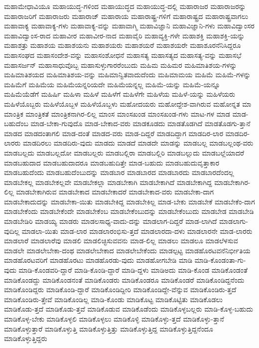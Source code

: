 {ಮಹಾಮೇಧಾವಿಯೂ
ಮಹಾಯುದ್ಧ-ಗಳಿಂದ
ಮಹಾಯುದ್ಧದ
ಮಹಾಯುದ್ಧ-ದಲ್ಲಿ
ಮಹಾರಾಜರ
ಮಹಾರಾಜರನ್ನು
ಮಹಾರಾಜರಿಗೆ
ಮಹಾರಾಜರು
ಮಹಾರಾಜ್
ಮಹಾರಾಯ
ಮಹಾರಾಷ್ಟ್ರ-ಗಳಿಗೆ
ಮಹಾರಾಷ್ಟ್ರದ
ಮಹಾರಾಷ್ಟ್ರವಾಗಲು
ಮಹಾವಾಕ್ಯ
ಮಹಾವಾಕ್ಯ-ಗಳು
ಮಹಾವಾಕ್ಯ-ವನ್ನು
ಮಹಾವಾಗ್ಮಿ
ಮಹಾವಿಜ್ಞಾನಿ
ಮಹಾವಿಜ್ಞಾನಿ-ಗಳು
ಮಹಾವಿದ್ವಾಂಸರ
ಮಹಾವಿದ್ವಾಂಸ-ರಾದ
ಮಹಾವೀರ
ಮಹಾವೀರ-ನಾದ
ಮಹಾವೈರಿ
ಮಹಾವ್ಯಕ್ತಿ-ಗಳೇ
ಮಹಾಶಕ್ತಿ
ಮಹಾಶಕ್ತಿ-ಯನ್ನು
ಮಹಾಶತ್ರು
ಮಹಾಶಯ
ಮಹಾಶಯನು
ಮಹಾಶಯರು
ಮಹಾಶಯರೆ
ಮಹಾಶಯರೇ
ಮಹಾಶೂರನೆನಿಸಿದ್ದರೂ
ಮಹಾಸಂಘದ
ಮಹಾಸಂದೇಶ-ವನ್ನು
ಮಹಾಸಂಶೋಧನೆ
ಮಹಾಸತ್ಯ
ಮಹಾಸತ್ಯದ
ಮಹಾಸತ್ಯ-ವನ್ನು
ಮಹಾಸಭೆ
ಮಹಾಸರ್ಜನ್
ಮಹಾಸಾಧುವೊಬ್ಬ
ಮಹಾಸುಳ್ಳುಗಾರರೆಂಬುದು
ಮಹಿಮ
ಮಹಿಮರ
ಮಹಿಮಾತಿಶಯ-ಗಳನ್ನು
ಮಹಿಮಾತಿಶಯದ
ಮಹಿಮಾತಿಶಯ-ವನ್ನು
ಮಹಿಮಾನ್ವಿತವಾದುದೆಂದು
ಮಹಿಮಾಮಯ
ಮಹಿಮೆ
ಮಹಿಮೆ-ಗಳನ್ನು
ಮಹಿಮೆಗೆ
ಮಹಿಮೆಯ
ಮಹಿಮೆಯನ್ನರಿಯದೇ
ಮಹಿಮೆಯನ್ನಲ್ಲ
ಮಹಿಮೆ-ಯನ್ನು
ಮಹಿಮೆ-ಯನ್ನೂ
ಮಹಿಮೆಯೆಡೆಗೆ
ಮಹಿರ್ಷಿ
ಮಹಿಳಾ
ಮಹಿಳೆ
ಮಹಿಳೆಗೆ
ಮಹಿಳೆಗೇ
ಮಹಿಳೆಯ
ಮಹಿಳೆ-ಯನ್ನು
ಮಹಿಳೆಯರು
ಮಹಿಳೆಯೊಬ್ಬರು
ಮಹಿಳೆಯೊಬ್ಬಳ
ಮಹಿಳೆಯೊಬ್ಬಳು
ಮಹೋದಯರು
ಮಹೋದ್ದೇಶ-ವಾಗಿರುವ
ಮಹೋನ್ನತ
ಮಾ
ಮಾಂತ್ರಿಕ
ಮಾಂತ್ರಿಕತೆ
ಮಾಂತ್ರಿಕನಾಗಿರ-ಲಿಲ್ಲ
ಮಾಂಸ
ಮಾಂಸಖಂಡ
ಮಾಂಸಖಂಡ-ಗಳು
ಮಾಟ-ಗಳ
ಮಾಡ
ಮಾಡ-ಬಹುದೆಂಬ
ಮಾಡ-ಬೇಕಾ-ಗುವುದೊ
ಮಾಡ-ಬೇಕಾದ-ವರು
ಮಾಡಕೂಡದು
ಮಾಡತೊಡಗಿದೆ
ಮಾಡತೊಡಗು-ತ್ತಾನೆ
ಮಾಡದ
ಮಾಡದಂತಾಗಲಿ
ಮಾಡ-ದಂತೆ
ಮಾಡದ-ವರು
ಮಾಡ-ದಿದ್ದರೆ
ಮಾಡದಿದ್ದಾಗ
ಮಾಡದಿರ-ಲಾರ
ಮಾಡದಿರ-ಲಾರರು
ಮಾಡದಿರಲು
ಮಾಡದಿರು-ವುದು
ಮಾಡದು
ಮಾಡದೆ
ಮಾಡದೇ
ಮಾಡನ್ನು
ಮಾಡಬಲ್ಲ
ಮಾಡಬಲ್ಲಂಥ-ವರು
ಮಾಡಬಲ್ಲದು
ಮಾಡಬಲ್ಲದೋ
ಮಾಡಬಲ್ಲರು
ಮಾಡಬಲ್ಲಿರಾ
ಮಾಡಬಲ್ಲಿರಿ
ಮಾಡಬಲ್ಲುದು
ಮಾಡಬಲ್ಲೆಯಾದರೆ
ಮಾಡಬಹುದಾದ
ಮಾಡಬಹುದಾದರೂ
ಮಾಡಬಹುದಿತ್ತೇ
ಮಾಡ-ಬಹುದು
ಮಾಡಬಹುದುವೃತ್ತಾಕಾರ
ಮಾಡಬಹುದೆಂದು
ಮಾಡಬಹುದೆಂಬುದನ್ನು
ಮಾಡಬಾರ
ಮಾಡಬಾರದ
ಮಾಡಬಾರದು
ಮಾಡಬಾರದೆಂದಲ್ಲ
ಮಾಡಬೇಕಲ್ಲ
ಮಾಡಬೇಕಲ್ಲವೇ
ಮಾಡಬೇಕಲ್ಲಾ
ಮಾಡಬೇಕಾಗಿ
ಮಾಡಬೇಕಾಗಿದೆ
ಮಾಡಬೇಕಾಗಿದ್ದ
ಮಾಡಬೇಕಾಗಿರ-ಲಿಲ್ಲ
ಮಾಡಬೇಕಾಗಿರುವ
ಮಾಡಬೇಕಾದ
ಮಾಡಬೇಕಾದರೆ
ಮಾಡಬೇಕಾದ-ವರು
ಮಾಡಬೇಕಾ-ದಾಗ
ಮಾಡಬೇಕಾದುದನ್ನು
ಮಾಡಬೇಕಾ-ಯಿತು
ಮಾಡಬೇಕಿದ್ದ
ಮಾಡಬೇಕಿಲ್ಲ
ಮಾಡ-ಬೇಕು
ಮಾಡಬೇಕೆ
ಮಾಡಬೇಕೆಂ-ದಾಗ
ಮಾಡಬೇಕೆಂದು
ಮಾಡಬೇಕೆಂದೇ
ಮಾಡಬೇಕೆಂಬ
ಮಾಡಬೇಕೆಂಬುದನ್ನು
ಮಾಡಬೇಕೆಂಬುದು
ಮಾಡಬೇಡ
ಮಾಡಬೇಡಿ
ಮಾಡಬೇಡಿರಿ
ಮಾಡಯ್ಯ
ಮಾಡರು
ಮಾಡಲಸಾಧ್ಯ-ವಾದು-ದನ್ನು
ಮಾಡಲಾಗ-ದಿದ್ದರೆ
ಮಾಡ-ಲಾಗಿದೆ
ಮಾಡಲಾಗು-ವುದಿಲ್ಲ
ಮಾಡಲಾ-ಯಿತು
ಮಾಡ-ಲಾರ
ಮಾಡಲಾರಂಭಿಸು-ತ್ತದೆ
ಮಾಡಲಾರದಾ-ದಳು
ಮಾಡಲಾರನೇ
ಮಾಡ-ಲಾರರು
ಮಾಡಲಾರೆ
ಮಾಡಲಾರೆವು
ಮಾಡಲಿ
ಮಾಡಲಿಚ್ಛಿಸುವವನು
ಮಾಡ-ಲಿಲ್ಲ
ಮಾಡಲು
ಮಾಡಲೂ
ಮಾಡಲೆಳಸುವ
ಮಾಡಲೇ
ಮಾಡಲೇಬೇಕಾ-ದಂಥ
ಮಾಡಲೇಬೇಕಾದ
ಮಾಡಲೇಬೇಕೆಂದು
ಮಾಡಲ್ಪಟ್ಟ
ಮಾಡಹೊರಟವನೆನಿರ್ಭೀತಿಯ
ಮಾಡಹೊರಟವರಿಗೆ
ಮಾಡಹೊರಟು
ಮಾಡಹೊರಡು-ವುದು
ಮಾಡಹೋಗಬೇಡಿ
ಮಾಡಿ
ಮಾಡಿ-ಕೊಂಡಂತಾ-ಗು-ವುದು
ಮಾಡಿ-ಕೊಂಡವರಿ-ದ್ದಾರೆ
ಮಾಡಿ-ಕೊಂಡಿ-ದ್ದಾರೆ
ಮಾಡಿ-ದ್ದಳು
ಮಾಡಿಅದು
ಮಾಡಿ-ಕೊಂಡ
ಮಾಡಿಕೊಂಡಂತೆ
ಮಾಡಿಕೊಂಡದ್ದು
ಮಾಡಿಕೊಂಡನಂತೆ
ಮಾಡಿಕೊಂಡರು
ಮಾಡಿಕೊಂಡರೂ
ಮಾಡಿಕೊಂಡರೆ
ಮಾಡಿಕೊಂಡಿದ್ದನೆಂದು
ಮಾಡಿಕೊಂಡಿದ್ದರು
ಮಾಡಿಕೊಂಡಿ-ದ್ದಾರೆ
ಮಾಡಿಕೊಂಡಿದ್ದೀರಿ
ಮಾಡಿಕೊಂಡಿದ್ದೇ-ವೆನ್ನುವ
ಮಾಡಿಕೊಂಡಿರು-ತ್ತದೆ
ಮಾಡಿಕೊಂಡಿರು-ತ್ತೇವೆ
ಮಾಡಿಕೊಂಡಿಲ್ಲ
ಮಾಡಿ-ಕೊಂಡು
ಮಾಡಿಕೊಟ್ಟ
ಮಾಡಿಕೊಟ್ಟಿತು
ಮಾಡಿಕೊಡಲು
ಮಾಡಿಕೊಡು-ತ್ತದೆ
ಮಾಡಿಕೊಡು-ತ್ತವೆ
ಮಾಡಿಕೊಡುವ
ಮಾಡಿಕೊಡೆಂದು
ಮಾಡಿಕೊಳ್ಳಬಲ್ಲರು
ಮಾಡಿ-ಕೊಳ್ಳ-ಬಹುದು
ಮಾಡಿಕೊಳ್ಳ-ಬೇಕು
ಮಾಡಿಕೊಳ್ಳಲಿ
ಮಾಡಿಕೊಳ್ಳಲು
ಮಾಡಿಕೊಳ್ಳಿ
ಮಾಡಿಕೊಳ್ಳು-ತ್ತದೆ
ಮಾಡಿಕೊಳ್ಳು-ತ್ತಾನೆ
ಮಾಡಿಕೊಳ್ಳುತ್ತಾರೆ
ಮಾಡಿಕೊಳ್ಳುತ್ತಿ
ಮಾಡಿಕೊಳ್ಳುತ್ತಿತ್ತು
ಮಾಡಿಕೊಳ್ಳುತ್ತಿದ್ದ
ಮಾಡಿಕೊಳ್ಳುತ್ತಿದ್ದನೆಂದೂ
ಮಾಡಿಕೊಳ್ಳುತ್ತಿದ್ದರು
}
